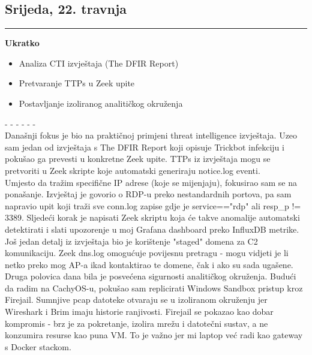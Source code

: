 \documentclass[12pt, a4paper]{article}
\newcommand{\dan}[1]{
    \subsection*{#1}
    \vspace{-0.5em} 
    \hrule \vspace{0.5em} 
}
\begin{document}
\dan{Srijeda, 22. travnja}
\textbf{Ukratko}
\begin{itemize}
    \item Analiza CTI izvještaja (The DFIR Report)
    \item Pretvaranje TTPs u Zeek upite
    \item Postavljanje izoliranog analitičkog okruženja
\end{itemize}
- - - - - - \\
Današnji fokus je bio na praktičnoj primjeni threat intelligence izvještaja. Uzeo sam jedan od izvještaja s The DFIR Report koji 
opisuje Trickbot infekciju i pokušao ga prevesti u konkretne Zeek upite. TTPs iz izvještaja mogu se pretvoriti u Zeek skripte 
koje automatski generiraju notice.log eventi.
\\
Umjesto da tražim specifične IP adrese (koje se mijenjaju), fokusirao sam se na ponašanje. Izvještaj je govorio o RDP-u preko 
nestandardnih portova, pa sam napravio upit koji traži sve conn.log zapise gdje je service=="rdp" ali resp\_p != 3389. Sljedeći 
korak je napisati Zeek skriptu koja će takve anomalije automatski detektirati i slati upozorenje u moj Grafana dashboard preko 
InfluxDB metrike.
\\
Još jedan detalj iz izvještaja bio je korištenje "staged" domena za C2 komunikaciju. Zeek dns.log omogućuje povijesnu pretragu - mogu 
vidjeti je li netko preko mog AP-a ikad kontaktirao te domene, čak i ako su sada ugašene.
\\
Druga polovica dana bila je posvećena sigurnosti analitičkog okruženja. Budući da radim na CachyOS-u, pokušao sam replicirati Windows 
Sandbox pristup kroz Firejail. Sumnjive pcap datoteke otvaraju se u izoliranom okruženju jer Wireshark i Brim imaju historie ranjivosti. 
Firejail se pokazao kao dobar kompromis - brz je za pokretanje, izolira mrežu i datotečni sustav, a ne konzumira resurse kao puna VM. 
To je važno jer mi laptop već radi kao gateway s Docker stackom.
\end{document}
